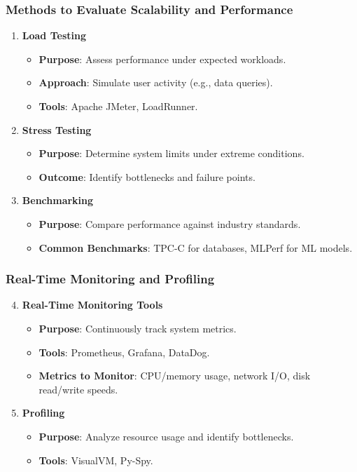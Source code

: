 \documentclass[aspectratio=169]{beamer}
\begin{document}
\begin{frame}[fragile]
    \frametitle{Methods to Evaluate Scalability and Performance}
    \begin{enumerate}
        \item \textbf{Load Testing}
        \begin{itemize}
            \item \textbf{Purpose}: Assess performance under expected workloads.
            \item \textbf{Approach}: Simulate user activity (e.g., data queries).
            \item \textbf{Tools}: Apache JMeter, LoadRunner.
        \end{itemize}

        \item \textbf{Stress Testing}
        \begin{itemize}
            \item \textbf{Purpose}: Determine system limits under extreme conditions.
            \item \textbf{Outcome}: Identify bottlenecks and failure points.
        \end{itemize}

        \item \textbf{Benchmarking}
        \begin{itemize}
            \item \textbf{Purpose}: Compare performance against industry standards.
            \item \textbf{Common Benchmarks}: TPC-C for databases, MLPerf for ML models.
        \end{itemize}
    \end{enumerate}
\end{frame}

\begin{frame}[fragile]
    \frametitle{Real-Time Monitoring and Profiling}
    \begin{enumerate}
        \setcounter{enumi}{3}
        
        \item \textbf{Real-Time Monitoring Tools}
        \begin{itemize}
            \item \textbf{Purpose}: Continuously track system metrics.
            \item \textbf{Tools}: Prometheus, Grafana, DataDog.
            \item \textbf{Metrics to Monitor}: CPU/memory usage, network I/O, disk read/write speeds.
        \end{itemize}

        \item \textbf{Profiling}
        \begin{itemize}
            \item \textbf{Purpose}: Analyze resource usage and identify bottlenecks.
            \item \textbf{Tools}: VisualVM, Py-Spy.
        \end{itemize}
    \end{enumerate}
\end{frame}
\end{document}
